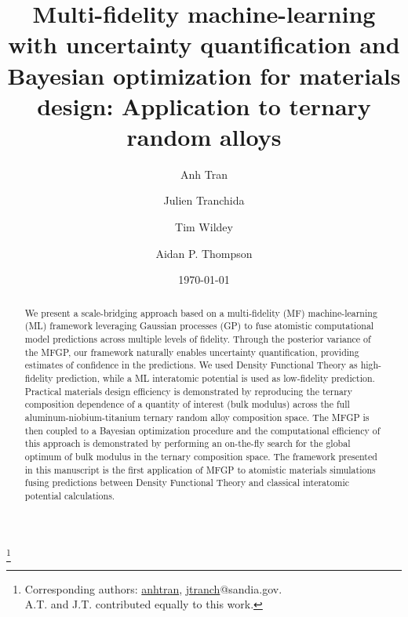 \documentclass[%
 reprint,
aip,jcp
]{revtex4-1}
\begin{document}

\title{Multi-fidelity machine-learning with uncertainty quantification
and Bayesian optimization for materials design: Application to ternary
random alloys}

\author{Anh Tran} 
 \thanks{\label{CorrAuth}Corresponding authors:  \href{anhtran@sandia.gov}{anhtran}, \href{jtranch@sandia.gov}{jtranch}@sandia.gov. \\
 A.T. and J.T. contributed equally to this work.}

\author{Julien Tranchida} 

%

\author{Tim Wildey}

\author{Aidan P. Thompson}%
%

\date{\today}%

\begin{abstract}
  We present a scale-bridging approach based on a 
  multi-fidelity (MF) machine-learning (ML) framework leveraging 
  Gaussian processes (GP) to fuse atomistic computational model
  predictions across multiple levels of fidelity.
  Through the posterior variance of the MFGP, our framework 
  naturally enables uncertainty quantification, providing estimates 
  of confidence in the predictions. 
  We used Density Functional Theory as high-fidelity prediction, while a 
  ML interatomic potential is used as low-fidelity prediction.
  Practical materials design efficiency is demonstrated by reproducing the
  ternary composition dependence of a quantity of interest
  (bulk modulus) across the full aluminum-niobium-titanium ternary random 
  alloy composition space.
  The MFGP is then coupled to a Bayesian optimization procedure
  and the computational efficiency of this approach is demonstrated
  by performing an on-the-fly search for the global optimum of bulk
  modulus in the ternary composition space. 
  The framework presented in this manuscript is the first application of MFGP 
  to atomistic materials simulations fusing predictions between Density 
  Functional Theory and classical interatomic potential calculations.
\end{abstract}
\end{document}
